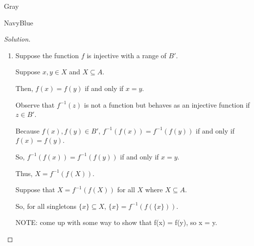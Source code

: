 \documentclass[12pt]{amsart}
\theoremstyle{named}
\newenvironment{soln}
{\begin{color}{Gray}\begin{framed}\begin{color}{NavyBlue}\begin{proof}[Solution]
\doublespacing}
{\end{proof}\end{color}\end{framed}\end{color}}
\theoremstyle{definition}
\begin{document}
\begin{soln}
	\phantom{ }
    
    \begin{enumerate}
        \item 
        \phantom{ }

        \noindent Suppose the function $f$ is injective with a range of $B'$.

        \noindent Suppose $x,y \in X$ and $X \subseteq A$.

        \noindent Then, $f(x) = f(y)$ if and only if $x = y$.

        \noindent Observe that $f^{-1}(z)$ is not a function but
        behaves as an injective function if $z \in B'$. 

        \noindent Because $f(x), f(y) \in B'$, $f^{-1}(f(x)) = f^{-1}(f(y))$
        if and only if $f(x) = f(y)$. 

        \noindent So, $f^{-1}(f(x)) = f^{-1}(f(y))$ if and only if $x = y$.

        \noindent Thus, $X = f^{-1}(f(X))$. 

        \phantom{ }

        \noindent Suppose that $X = f^{-1}(f(X))$ for all $X$ where $X \subseteq A$.

        \noindent So, for all singletons $\{x\} \subseteq X$, $\{x\} = f^{-1}(f(\{x\}))$.

        NOTE: come up with some way to show that f(x) = f(y), so x = y.



        

        \noindent 
    \end{enumerate}
\end{soln}
\end{document}
